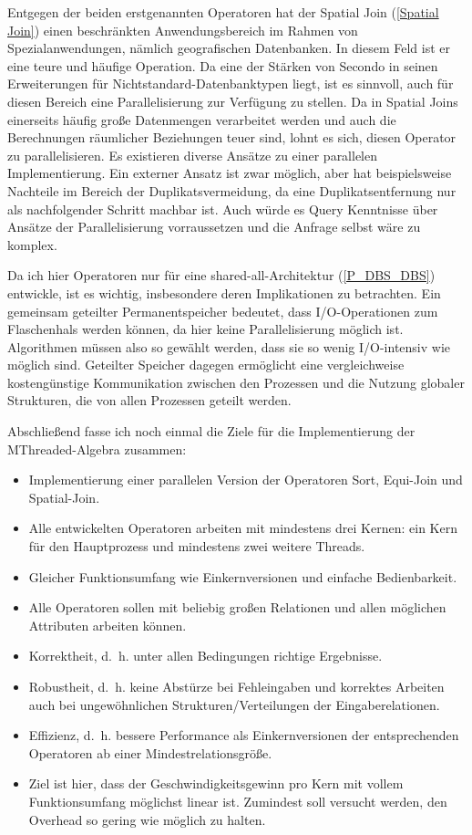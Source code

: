 \documentclass[a4paper,12pt,twoside]{article}
\begin{document}
{Entgegen der beiden erstgenannten Operatoren hat der Spatial Join (\autoref{Spatial Join}) einen beschränkten Anwendungsbereich im Rahmen von Spezialanwendungen, nämlich geografischen Datenbanken. In diesem Feld ist er eine teure und häufige Operation. Da eine der Stärken von Secondo in seinen Erweiterungen für Nichtstandard-Datenbanktypen liegt, ist es sinnvoll, auch für diesen Bereich eine Parallelisierung zur Verfügung zu stellen. Da in Spatial Joins einerseits häufig große Datenmengen verarbeitet werden und auch die Berechnungen räumlicher Beziehungen teuer sind, lohnt es sich, diesen Operator zu parallelisieren. Es existieren diverse Ansätze zu einer parallelen Implementierung. Ein externer Ansatz ist zwar möglich, aber hat beispielsweise Nachteile im Bereich der Duplikatsvermeidung, da eine Duplikatsentfernung nur als nachfolgender Schritt machbar ist. Auch würde es Query Kenntnisse über Ansätze der Parallelisierung vorraussetzen und die Anfrage selbst wäre zu komplex. 

Da ich hier Operatoren nur für eine shared-all-Architektur (\autoref{P_DBS_DBS}) entwickle, ist es wichtig, insbesondere deren Implikationen zu betrachten. Ein gemeinsam geteilter Permanentspeicher bedeutet, dass I/O-Operationen zum Flaschenhals werden können, da hier keine Parallelisierung möglich ist. Algorithmen müssen also so gewählt werden, dass sie so wenig I/O-intensiv wie möglich sind. Geteilter Speicher dagegen ermöglicht eine vergleichweise kostengünstige Kommunikation zwischen den Prozessen und die Nutzung globaler Strukturen, die von allen Prozessen geteilt werden.

Abschließend fasse ich noch einmal die Ziele für die Implementierung der MThreaded-Algebra zusammen:

\begin{itemize}
	\item Implementierung einer parallelen Version der Operatoren Sort, Equi-Join und Spatial-Join.
	\item Alle entwickelten Operatoren arbeiten mit mindestens drei Kernen: ein Kern für den Hauptprozess und mindestens zwei weitere Threads.
	\item Gleicher Funktionsumfang wie Einkernversionen und einfache Bedienbarkeit.
	\item Alle Operatoren sollen mit beliebig großen Relationen und allen möglichen Attributen arbeiten können.  
	\item Korrektheit, d.~h. unter allen Bedingungen richtige Ergebnisse.
	\item Robustheit, d.~h. keine Abstürze bei Fehleingaben und korrektes Arbeiten auch bei ungewöhnlichen Strukturen/Verteilungen der Eingaberelationen.
	\item Effizienz, d.~h. bessere Performance als Einkernversionen der entsprechenden Operatoren ab einer Mindestrelationsgröße.
	\item Ziel ist hier, dass der Geschwindigkeitsgewinn pro Kern mit vollem Funktionsumfang möglichst linear ist. Zumindest soll versucht werden, den Overhead so gering wie möglich zu halten.
\end{itemize}

}
\end{document}
